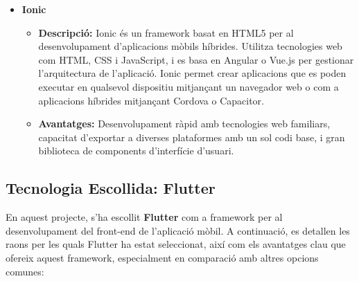 \documentclass[a4paper,12pt,twoside]{ThesisStyle}
\begin{document}
\begin{itemize}
    \item \textbf{Ionic}
    \begin{itemize}
        \item \textbf{Descripció:} Ionic és un framework basat en HTML5 per al desenvolupament d'aplicacions mòbils híbrides. Utilitza tecnologies web com HTML, CSS i JavaScript, i es basa en Angular o Vue.js per gestionar l'arquitectura de l'aplicació. Ionic permet crear aplicacions que es poden executar en qualsevol dispositiu mitjançant un navegador web o com a aplicacions híbrides mitjançant Cordova o Capacitor.
        \item \textbf{Avantatges:} Desenvolupament ràpid amb tecnologies web familiars, capacitat d'exportar a diverses plataformes amb un sol codi base, i gran biblioteca de components d'interfície d'usuari.
    \end{itemize}
    
\end{itemize}

\subsection{Tecnologia Escollida: Flutter}
\label{subsec: Tecnologia Escollida: Flutter}

En aquest projecte, s'ha escollit \textbf{Flutter} com a framework per al desenvolupament del front-end de l'aplicació mòbil. A continuació, es detallen les raons per les quals Flutter ha estat seleccionat, així com els avantatges clau que ofereix aquest framework, especialment en comparació amb altres opcions comunes:
\end{document}
